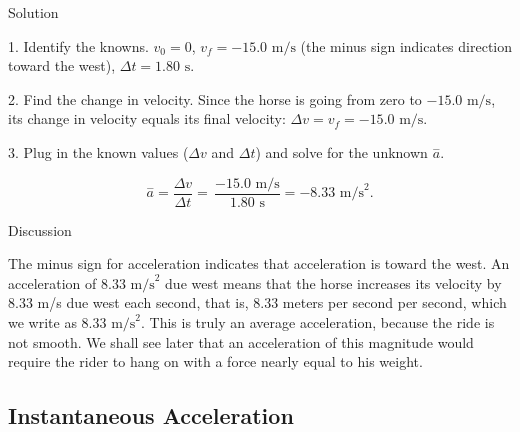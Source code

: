 \documentclass[
]{book}
\newenvironment{tinysection}{}{}
\begin{document}
\begin{tinysection}

{Solution}

\end{tinysection}

1. Identify the knowns. \({v_{0} = 0}{}\),
\({v_{f} = {- \text{15}}}\text{.0\ m/s}\) (the minus sign indicates
direction toward the west), \({{\Delta t = 1}\text{.80\ s}}{}\).

2. Find the change in velocity. Since the horse is going from zero to
\({- \text{15.0\ m/s}}{}\), its change in velocity equals its final
velocity: \({{{\Delta v = v_{f}} = {- \text{15}}}\text{.0\ m/s}}{}\).

3. Plug in the known values (\({\Delta v}{}\) and \(\Delta t\)) and solve
for the unknown \(\overset{-}{a}{}\).

\leavevmode\hypertarget{import-auto-id2400983}{}%
\[{{{{{\overset{-}{a} = \frac{\Delta v}{\Delta t}} = \,\frac{{- \text{15}}\text{.0\ m/s}}{1\text{.80\ s}}} = {- 8}}\text{.33\ m}\text{/s}^{2}}.}{}\]

\begin{tinysection}

{Discussion}

\end{tinysection}

The minus sign for acceleration indicates that acceleration is toward
the west. An acceleration of \({8\text{.33\ m}\text{/s}^{2}}{}\) due west
means that the horse increases its velocity by 8.33 m/s due west each
second, that is, 8.33 meters per second per second, which we write as
\({8\text{.33\ m}\text{/s}^{2}}{}\). This is truly an average
acceleration, because the ride is not smooth. We shall see later that an
acceleration of this magnitude would require the rider to hang on with a
force nearly equal to his weight.

\hypertarget{fs-id1759915}{}
\hypertarget{instantaneous-acceleration}{%
\subsection{Instantaneous Acceleration}\label{instantaneous-acceleration}}
\end{document}
